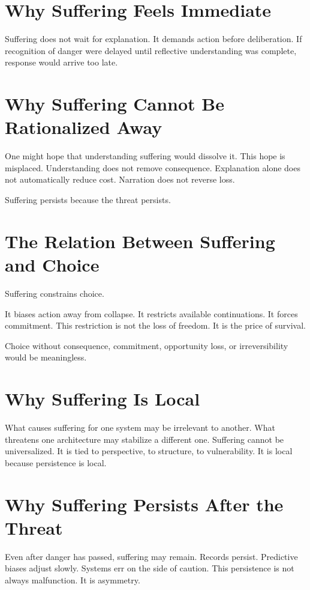 \documentclass[11pt,twoside,openright]{book}
\begin{document}
\section*{Why Suffering Feels Immediate}

Suffering does not wait for explanation. It demands action before deliberation. If recognition of danger were delayed until reflective understanding was complete, response would arrive too late.

\section*{Why Suffering Cannot Be Rationalized Away}

One might hope that understanding suffering would dissolve it. This hope is misplaced. Understanding does not remove consequence. Explanation alone does not automatically reduce cost. Narration does not reverse loss.

Suffering persists because the threat persists.

\section*{The Relation Between Suffering and Choice}

Suffering constrains choice.

It biases action away from collapse. It restricts available continuations. It forces commitment. This restriction is not the loss of freedom. It is the price of survival.

Choice without consequence, commitment, opportunity loss, or irreversibility would be meaningless.

\section*{Why Suffering Is Local}

What causes suffering for one system may be irrelevant to another. What threatens one architecture may stabilize a different one. Suffering cannot be universalized. It is tied to perspective, to structure, to vulnerability. It is local because persistence is local.

\section*{Why Suffering Persists After the Threat}

Even after danger has passed, suffering may remain. Records persist. Predictive biases adjust slowly. Systems err on the side of caution. This persistence is not always malfunction. It is asymmetry.
\end{document}
